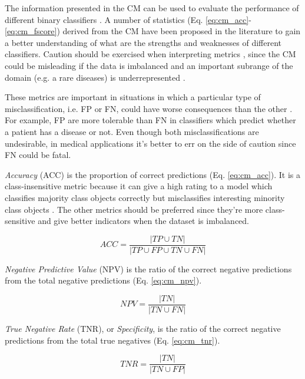 The information presented in the CM can be used to evaluate the performance of different binary classifiers \citep{lu2004predicting}. A number of statistics (Eq. \ref{eq:cm_acc}-\ref{eq:cm_fscore}) derived from the CM have been proposed in the literature \citep{deng2016improved} to gain a better understanding of what are the strengths and weaknesses of different classifiers. Caution should be exercised when interpreting metrics \citep{jeni2013facing}, since the CM could be misleading if the data is imbalanced and an important subrange of the domain (e.g. a rare diseases) is underrepresented \citep{raeder2012learning}.

These metrics are important in situations in which a particular type of misclassification, i.e. FP or FN, could have worse consequences than the other \citep{hassanien2017advances}. For example, FP are more tolerable than FN in classifiers which predict whether a patient has a disease or not. Even though both misclassifications are undesirable, in medical applications it's better to err on the side of caution since FN could be fatal.

\textit{Accuracy} (ACC) is the proportion of correct predictions (Eq. \ref{eq:cm_acc}). It is a class-insensitive metric because it can give a high rating to a model which classifies majority class objects correctly but misclassifies interesting minority class objects \citep{branco2016survey}. The other metrics should be preferred since they're more class-sensitive and give better indicators when the dataset is imbalanced.

\begin{equation}
\label{eq:cm_acc}
ACC = \frac{|TP \cup TN|}{|TP \cup FP \cup TN \cup FN|}
\end{equation}

\textit{Negative Predictive Value} (NPV) is the ratio of the correct negative predictions from the total negative predictions (Eq. \ref{eq:cm_npv}).

\begin{equation}
\label{eq:cm_npv}
NPV = \frac{|TN|}{|TN \cup FN|}
\end{equation}

\textit{True Negative Rate} (TNR), or \textit{Specificity}, is the ratio of the correct negative predictions from the total true negatives (Eq. \ref{eq:cm_tnr}).

\begin{equation}
\label{eq:cm_tnr}
TNR = \frac{|TN|}{|TN \cup FP|}
\end{equation}

